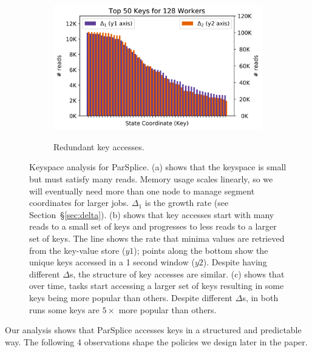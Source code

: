 \begin{figure}[t]
\begin{subfigure}[b]{.32\linewidth}
{    \label{fig:motivation-regimes}}
  \end{subfigure}
  \begin{subfigure}[b]{.32\linewidth}
    \includegraphics[width=1.05\textwidth]{figures/methodology-keys.png}\\
    \caption{Redundant key accesses.
    \label{fig:methodology-keys}}
  \end{subfigure}
  \caption{Keyspace analysis for ParSplice.
    (a) shows that the keyspace is small but must satisfy many reads. Memory
    usage scales linearly, so we will eventually need more than one node to manage
    segment coordinates for larger jobs. \(\Delta_1\) is the growth rate (see
    Section~\S\ref{sec:delta}).
    (b) shows that key accesses start with many reads to a small set of
    keys and progresses to less reads to a larger set of keys.  The line shows the
    rate that minima values are retrieved from the key-value store (\(y1\));
    points along the bottom show the unique keys accessed in a 1
    second window (\(y2\)). Despite having different
    \(\Delta\)s, the structure of key accesses are similar.
    (c) shows that over time, tasks start accessing a larger set of keys resulting in
    some keys being more popular than others.  Despite different
    \(\Delta\)s, in both runs some keys are \(5\times\) more popular than others.
  }
\end{figure}

Our analysis shows that ParSplice accesses keys in a structured and predictable
way. The following 4 observations shape the policies we design later in the
paper.

